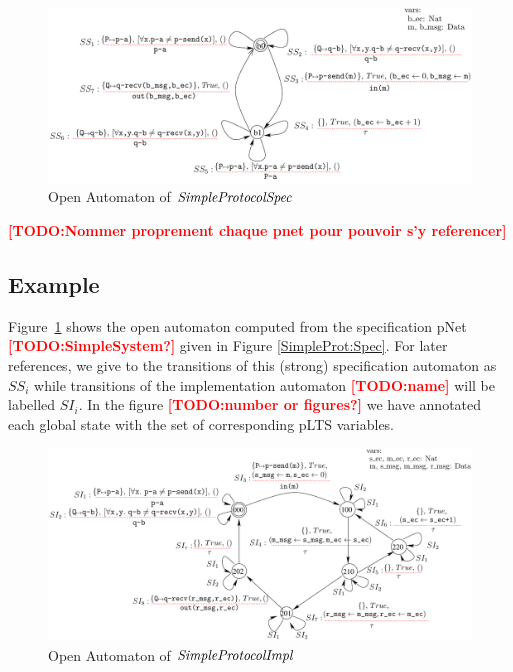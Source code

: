 \documentclass{lmcs}
\newcommand{\TODO}[1]{\textcolor{red}{\textbf{[TODO:#1]}}}
\begin{document}




\begin{figure}[ht]
   \centerline{\includegraphics[width=13cm]{XFIG/SPSpecOpen}}
   \caption{Open Automaton of  $\symb{SimpleProtocolSpec}$}
   \label{SimpleProtCounter:SpecOA}
\end{figure}

\TODO{Nommer proprement chaque pnet pour pouvoir s'y referencer}
\subsection*{Example}  Figure~\ref{SimpleProtCounter:SpecOA} shows the open automaton computed from the specification pNet \TODO{SimpleSystem?} given in Figure \ref{SimpleProt:Spec}. 
For later references, we give to the transitions of this (strong)
specification automaton as $SS_i$ while transitions of the
implementation automaton \TODO{name} will be labelled $SI_i$. In the figure \TODO{number or figures?} we
have annotated each global state with the set of corresponding pLTS variables.


 \begin{figure}[ht]
  \centerline{\includegraphics[width=15cm]{XFIG/SPImplOpen}}
  \caption{Open Automaton of $\symb{SimpleProtocolImpl}$}  \label{SimpleProtCounter:ImplOA}
\end{figure}
\end{document}

